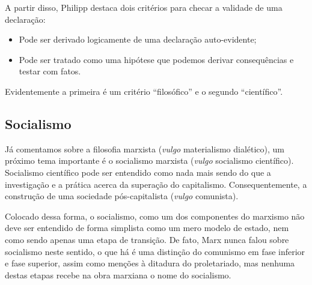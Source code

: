 A partir disso, Philipp destaca dois critérios para checar a validade de uma declaração:

\begin{itemize}
    \item Pode ser derivado logicamente de uma declaração auto-evidente;
    \item Pode ser tratado como uma hipótese que podemos derivar consequências e testar com fatos.
\end{itemize}
Evidentemente a primeira é um critério “filosófico” e o segundo “científico”. 

\subsection{Socialismo}

Já comentamos sobre a filosofia marxista (\textit{vulgo} materialismo dialético), um próximo tema importante é o socialismo marxista (\textit{vulgo} socialismo científico). Socialismo científico pode ser entendido como nada mais sendo do que a investigação e a prática acerca da superação do capitalismo. Consequentemente, a construção de uma sociedade pós-capitalista (\textit{vulgo} comunista).

Colocado dessa forma, o socialismo, como um dos componentes do marxismo não deve ser entendido de forma simplista como um mero modelo de estado, nem como sendo apenas uma etapa de transição. De fato, Marx nunca falou sobre socialismo neste sentido, o que há é uma distinção do comunismo em fase inferior e fase superior, assim como menções à ditadura do proletariado, mas nenhuma destas etapas recebe na obra marxiana o nome do socialismo.

